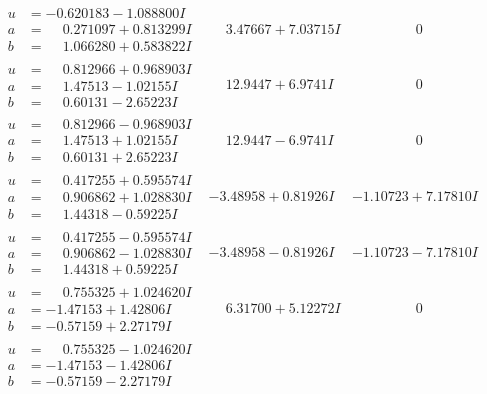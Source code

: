 \documentclass[1p]{elsarticle_modified}
\theoremstyle{definition}
\begin{document}
$$\begin{array}{c|c|c}
\begin{aligned}
u &= -0.620183 - 1.088800 I \\
a &= \phantom{-}0.271097 + 0.813299 I \\
b &= \phantom{-}1.066280 + 0.583822 I\end{aligned}
 & \phantom{-}3.47667 + 7.03715 I & \phantom{-0.000000 } 0 \\ \hline\begin{aligned}
u &= \phantom{-}0.812966 + 0.968903 I \\
a &= \phantom{-}1.47513 - 1.02155 I \\
b &= \phantom{-}0.60131 - 2.65223 I\end{aligned}
 & \phantom{-}12.9447 + 6.9741 I & \phantom{-0.000000 } 0 \\ \hline\begin{aligned}
u &= \phantom{-}0.812966 - 0.968903 I \\
a &= \phantom{-}1.47513 + 1.02155 I \\
b &= \phantom{-}0.60131 + 2.65223 I\end{aligned}
 & \phantom{-}12.9447 - 6.9741 I & \phantom{-0.000000 } 0 \\ \hline\begin{aligned}
u &= \phantom{-}0.417255 + 0.595574 I \\
a &= \phantom{-}0.906862 + 1.028830 I \\
b &= \phantom{-}1.44318 - 0.59225 I\end{aligned}
 & -3.48958 + 0.81926 I & -1.10723 + 7.17810 I \\ \hline\begin{aligned}
u &= \phantom{-}0.417255 - 0.595574 I \\
a &= \phantom{-}0.906862 - 1.028830 I \\
b &= \phantom{-}1.44318 + 0.59225 I\end{aligned}
 & -3.48958 - 0.81926 I & -1.10723 - 7.17810 I \\ \hline\begin{aligned}
u &= \phantom{-}0.755325 + 1.024620 I \\
a &= -1.47153 + 1.42806 I \\
b &= -0.57159 + 2.27179 I\end{aligned}
 & \phantom{-}6.31700 + 5.12272 I & \phantom{-0.000000 } 0 \\ \hline\begin{aligned}
u &= \phantom{-}0.755325 - 1.024620 I \\
a &= -1.47153 - 1.42806 I \\
b &= -0.57159 - 2.27179 I\end{aligned}

\end{array}$$
\end{document}
